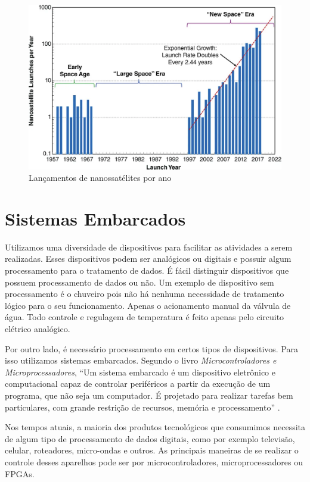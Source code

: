 \documentclass[
	12pt,				%
	openright,			%
	twoside,			%
	a4paper,			%
	english,			%
	french,				%
	spanish,			%
	brazil				%
	]{abntex2}
\newcommand{\quotes}[1]{``#1''}
\begin{document}
\begin{figure}[H]
	\caption{\label{fig:launches}Lançamentos de nanossatélites por ano}
	\begin{center}
	    \includegraphics[scale=0.4]{img/Launches.png}
	\end{center}
\end{figure}

\section{Sistemas Embarcados}

Utilizamos uma diversidade de dispositivos para facilitar as atividades a serem realizadas.
Esses dispositivos podem ser analógicos ou digitais e possuir algum processamento para o tratamento de dados. É fácil distinguir dispositivos que possuem processamento de dados ou não. Um exemplo de dispositivo sem processamento é o chuveiro pois não há nenhuma necessidade de tratamento lógico para o seu funcionamento. Apenas o acionamento manual da válvula de água. Todo controle e regulagem de temperatura é feito apenas pelo circuito elétrico analógico. 

Por outro lado, é necessário processamento em certos tipos de dispositivos. Para isso utilizamos sistemas embarcados. Segundo o livro \emph{Microcontroladores e Microprocessadores},
\quotes{Um sistema embarcado é um dispositivo eletrônico e computacional
capaz de controlar periféricos a partir da execução de um programa,
que não seja um computador. É projetado para realizar tarefas
bem particulares, com grande restrição de recursos, memória e
processamento} \cite{perim_2017}.

Nos tempos atuais, a maioria dos produtos tecnológicos que consumimos necessita de algum tipo de processamento de dados digitais, como por exemplo televisão, celular, roteadores, micro-ondas e outros. As principais maneiras de se realizar o controle desses aparelhos pode ser por microcontroladores, microprocessadores ou FPGAs.
\end{document}
